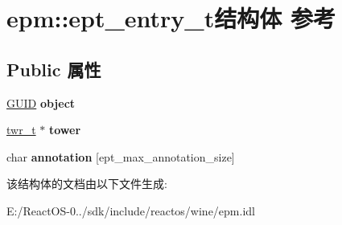 \hypertarget{structepm_1_1ept__entry__t}{}\section{epm\+:\+:ept\+\_\+entry\+\_\+t结构体 参考}
\label{structepm_1_1ept__entry__t}
\subsection*{Public 属性}
\begin{DoxyCompactItemize}
\item 
\mbox{\label{structepm_1_1ept__entry__t_ae98be3ff33508c8d289dad487be2114f}} 
\hyperlink{interface_g_u_i_d}{G\+U\+ID} {\bfseries object}
\item 
\mbox{\label{structepm_1_1ept__entry__t_ab4e7d141404722a61b30ca19ad5e836b}} 
\hyperlink{structtwr__t}{twr\+\_\+t} $\ast$ {\bfseries tower}
\item 
\mbox{\label{structepm_1_1ept__entry__t_a82fb7232f40f257c6aa8be98f56dff2b}} 
char {\bfseries annotation} \mbox{[}ept\+\_\+max\+\_\+annotation\+\_\+size\mbox{]}
\end{DoxyCompactItemize}


该结构体的文档由以下文件生成\+:\begin{DoxyCompactItemize}
\item 
E\+:/\+React\+O\+S-\/0../sdk/include/reactos/wine/epm.\+idl\end{DoxyCompactItemize}
